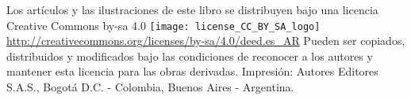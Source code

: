 
\vspace{1cm} %
\hspace{1cm}\newline %

\begin{center}
Los artículos y las ilustraciones de este libro se 
distribuyen bajo una licencia Creative Commons by-sa 4.0 
\newline
\texttt{[image: license\_CC\_BY\_SA\_logo]}
{\small 
\url{http://creativecommons.org/licenses/by-sa/4.0/deed.es_AR}
}
\newline
Pueden ser copiados, distribuidos y modificados bajo las condiciones 
de reconocer a los autores y mantener esta licencia para las obras derivadas.
\newline\newline
Impresión: Autores Editores S.A.S.,
\newline
Bogotá D.C. - Colombia, Buenos Aires - Argentina.

\end{center}
